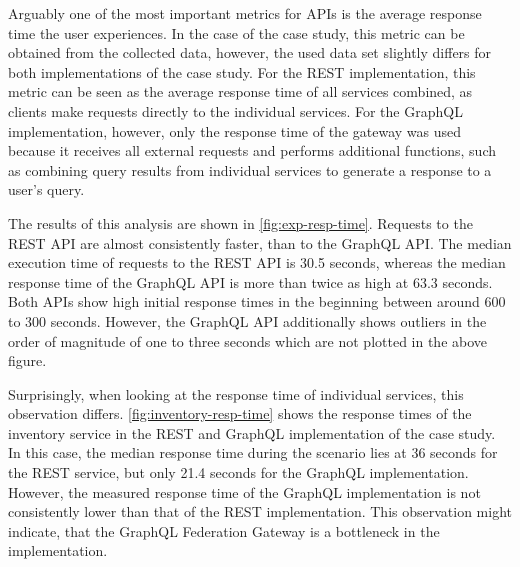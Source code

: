Arguably one of the most important metrics for \acp{API} is the average response time the user experiences.
In the case of the case study, this metric can be obtained from the collected data, however, the used data set slightly differs for both implementations of the case study.
For the \ac{REST} implementation, this metric can be seen as the average response time of all services combined, as clients make requests directly to the individual services.
For the GraphQL implementation, however, only the response time of the gateway was used because it receives all external requests and performs additional functions, such as combining query results from individual services to generate a response to a user's query.

The results of this analysis are shown in \autoref{fig:exp-resp-time}.
Requests to the \ac{REST} \ac{API} are almost consistently faster, than to the GraphQL \ac{API}.
The median execution time of requests to the \ac{REST} \ac{API} is 30.5 seconds, whereas the median response time of the GraphQL \ac{API} is more than twice as high at 63.3 seconds.
Both \acp{API} show high initial response times in the beginning between around 600 to 300 seconds.
However, the GraphQL \ac{API} additionally shows outliers in the order of magnitude of one to three seconds which are not plotted in the above figure.

Surprisingly, when looking at the response time of individual services, this observation differs.
\autoref{fig:inventory-resp-time} shows the response times of the inventory service in the \ac{REST} and GraphQL implementation of the case study.
In this case, the median response time during the scenario lies at 36 seconds for the \ac{REST} service, but only 21.4 seconds for the GraphQL implementation.
However, the measured response time of the GraphQL implementation is not consistently lower than that of the \ac{REST} implementation.
This observation might indicate, that the GraphQL Federation Gateway is a bottleneck in the implementation.


